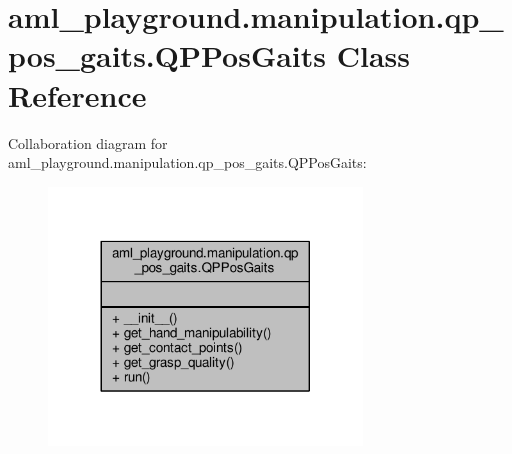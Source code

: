 \hypertarget{classaml__playground_1_1manipulation_1_1qp__pos__gaits_1_1_q_p_pos_gaits}{\section{aml\-\_\-playground.\-manipulation.\-qp\-\_\-pos\-\_\-gaits.\-Q\-P\-Pos\-Gaits Class Reference}
\label{classaml__playground_1_1manipulation_1_1qp__pos__gaits_1_1_q_p_pos_gaits}
}


Collaboration diagram for aml\-\_\-playground.\-manipulation.\-qp\-\_\-pos\-\_\-gaits.\-Q\-P\-Pos\-Gaits\-:
\nopagebreak
\begin{figure}[H]
\begin{center}
\leavevmode
\includegraphics[width=236pt]{classaml__playground_1_1manipulation_1_1qp__pos__gaits_1_1_q_p_pos_gaits__coll__graph}
\end{center}
\end{figure}
